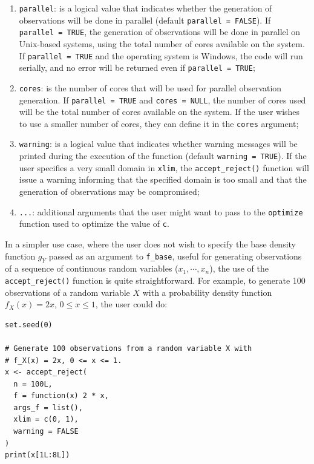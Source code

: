 \begin{enumerate}
  \texttt{c}: is the constant \(c\) that will be used to multiply the base probability density function \(g_Y\), so it envelops (bounds) \(f_X\). The default is \texttt{c\ =\ 1}. Unless there is a very strong reason, considering \texttt{c\ =\ NULL} as the default will be a good choice because the \texttt{accept\_reject()} function will attempt to find an optimal value for the constant \(c\);
\item
  \texttt{parallel}: is a logical value that indicates whether the generation of observations will be done in parallel (default \texttt{parallel\ =\ FALSE}). If \texttt{parallel\ =\ TRUE}, the generation of observations will be done in parallel on Unix-based systems, using the total number of cores available on the system. If \texttt{parallel\ =\ TRUE} and the operating system is Windows, the code will run serially, and no error will be returned even if \texttt{parallel\ =\ TRUE};
\item
  \texttt{cores}: is the number of cores that will be used for parallel observation generation. If \texttt{parallel\ =\ TRUE} and \texttt{cores\ =\ NULL}, the number of cores used will be the total number of cores available on the system. If the user wishes to use a smaller number of cores, they can define it in the \texttt{cores} argument;
\item
  \texttt{warning}: is a logical value that indicates whether warning messages will be printed during the execution of the function (default \texttt{warning\ =\ TRUE}). If the user specifies a very small domain in \texttt{xlim}, the \texttt{accept\_reject()} function will issue a warning informing that the specified domain is too small and that the generation of observations may be compromised;
\item
  \texttt{...}: additional arguments that the user might want to pass to the \texttt{optimize} function used to optimize the value of \texttt{c}.
\end{enumerate}

In a simpler use case, where the user does not wish to specify the base density function \(g_Y\) passed as an argument to \texttt{f\_base}, useful for generating observations of a sequence of continuous random variables (\(x_1, \cdots, x_n\)), the use of the \texttt{accept\_reject()} function is quite straightforward. For example, to generate 100 observations of a random variable \(X\) with a probability density function \(f_X(x) = 2x\), \(0 \leq x \leq 1\), the user could do:

\begin{verbatim}
set.seed(0)

# Generate 100 observations from a random variable X with
# f_X(x) = 2x, 0 <= x <= 1.
x <- accept_reject(
  n = 100L,
  f = function(x) 2 * x,
  args_f = list(),
  xlim = c(0, 1),
  warning = FALSE
)
print(x[1L:8L])
\end{verbatim}

